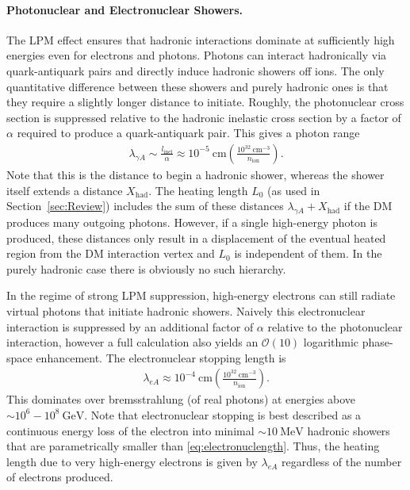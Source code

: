 \documentclass[twocolumn, preprintnumbers,amsmath,amssymb,prd, superscriptaddress]{revtex4}
\newcommand{\OO}{\mathcal{O}}
\newcommand{\GeV}{\text{GeV}}
\newcommand{\MeV}{\text{MeV}}
\def\r{\right)}
\def\l{\left(}
\begin{document}
\paragraph{Photonuclear and Electronuclear Showers.}
The LPM effect ensures that hadronic interactions dominate at sufficiently high energies even for electrons and photons.
Photons can interact hadronically via quark-antiquark pairs and directly induce hadronic showers off ions.
The only quantitative difference between these showers and purely hadronic ones is that they require a slightly longer distance to initiate.
Roughly, the photonuclear cross section is suppressed relative to the hadronic inelastic cross section by a factor of $\alpha$ required to produce a quark-antiquark pair.
This gives a photon range
\begin{align}
\label{eq:photonuclength}
  \lambda_{\gamma A} \sim \frac{l_\text{inel}}{\alpha}
  \approx 10^{-5} ~\text{cm} \l\frac{10^{32}~\text{cm}^{-3}}{n_\text{ion}}\r.
\end{align}
Note that this is the distance to begin a hadronic shower, whereas the shower itself extends a distance $X_\text{had}$.
The heating length $L_0$ (as used in Section~\ref{sec:Review}) includes the sum of these distances $\lambda_{\gamma A} + X_\text{had}$ if the DM produces many outgoing photons.
However, if a single high-energy photon is produced, these distances only result in a displacement of the eventual heated region from the DM interaction vertex and $L_0$ is independent of them.  
In the purely hadronic case there is obviously no such hierarchy.

In the regime of strong LPM suppression, high-energy electrons can still radiate virtual photons that initiate hadronic showers.
Naively this electronuclear interaction is suppressed by an additional factor of $\alpha$ relative to the photonuclear interaction, however a full calculation also yields an $\OO(10)$ logarithmic phase-space enhancement.
The electronuclear stopping length is 
\begin{align}
\label{eq:electronuclength}
  \lambda_{eA}
  \approx 10^{-4} ~\text{cm} \l\frac{10^{32}~\text{cm}^{-3}}{n_\text{ion}}\r.
\end{align}
This dominates over bremsstrahlung (of real photons) at energies above $\sim 10^6 - 10^8 ~\GeV$. 
Note that electronuclear stopping is best described as a continuous energy loss of the electron into minimal $\sim 10 ~\MeV$ hadronic showers that are parametrically smaller than \eqref{eq:electronuclength}. 
Thus, the heating length due to very high-energy electrons is given by $\lambda_{eA}$ regardless of the number of electrons produced.
\end{document}
